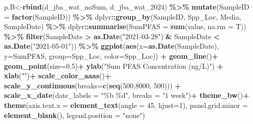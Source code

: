 \documentclass[
]{article}
\newenvironment{Shaded}{\begin{snugshade}}{\end{snugshade}}
\newcommand{\AttributeTok}[1]{\textcolor[rgb]{0.13,0.29,0.53}{#1}}
\newcommand{\DecValTok}[1]{\textcolor[rgb]{0.00,0.00,0.81}{#1}}
\newcommand{\FloatTok}[1]{\textcolor[rgb]{0.00,0.00,0.81}{#1}}
\newcommand{\FunctionTok}[1]{\textcolor[rgb]{0.13,0.29,0.53}{\textbf{#1}}}
\newcommand{\NormalTok}[1]{#1}
\newcommand{\OtherTok}[1]{\textcolor[rgb]{0.56,0.35,0.01}{#1}}
\newcommand{\SpecialCharTok}[1]{\textcolor[rgb]{0.81,0.36,0.00}{\textbf{#1}}}
\newcommand{\StringTok}[1]{\textcolor[rgb]{0.31,0.60,0.02}{#1}}
\begin{document}
\begin{Shaded}
\begin{Highlighting}[]
\NormalTok{p.B}\OtherTok{\textless{}{-}}\FunctionTok{rbind}\NormalTok{(d\_jba\_wat\_noSum, d\_jba\_wat\_2024) }\SpecialCharTok{\%\textgreater{}\%}
  \FunctionTok{mutate}\NormalTok{(}\AttributeTok{SampleID =} \FunctionTok{factor}\NormalTok{(SampleID)) }\SpecialCharTok{\%\textgreater{}\%}
\NormalTok{  dplyr}\SpecialCharTok{::}\FunctionTok{group\_by}\NormalTok{(SampleID, Spp\_Loc, Media, SampleDate) }\SpecialCharTok{\%\textgreater{}\%}
\NormalTok{  dplyr}\SpecialCharTok{::}\FunctionTok{summarise}\NormalTok{(}\AttributeTok{SumPFAS =} \FunctionTok{sum}\NormalTok{(value, }\AttributeTok{na.rm =}\NormalTok{ T)) }\SpecialCharTok{\%\textgreater{}\%}
  \FunctionTok{filter}\NormalTok{(SampleDate }\SpecialCharTok{\textgreater{}} \FunctionTok{as.Date}\NormalTok{(}\StringTok{"2021{-}03{-}28"}\NormalTok{) }\SpecialCharTok{\&}\NormalTok{ SampleDate }\SpecialCharTok{\textless{}} \FunctionTok{as.Date}\NormalTok{(}\StringTok{"2021{-}05{-}01"}\NormalTok{)) }\SpecialCharTok{\%\textgreater{}\%} 
    \FunctionTok{ggplot}\NormalTok{(}\FunctionTok{aes}\NormalTok{(}\AttributeTok{x=}\FunctionTok{as.Date}\NormalTok{(SampleDate), }\AttributeTok{y=}\NormalTok{SumPFAS, }\AttributeTok{group=}\NormalTok{Spp\_Loc, }\AttributeTok{color=}\NormalTok{Spp\_Loc)) }\SpecialCharTok{+}
    \FunctionTok{geom\_line}\NormalTok{()}\SpecialCharTok{+}
    \FunctionTok{geom\_point}\NormalTok{(}\AttributeTok{size=}\FloatTok{0.5}\NormalTok{)}\SpecialCharTok{+}
    \FunctionTok{ylab}\NormalTok{(}\StringTok{"Sum PFAS Concentration (ng/L)"}\NormalTok{) }\SpecialCharTok{+}
    \FunctionTok{xlab}\NormalTok{(}\StringTok{""}\NormalTok{)}\SpecialCharTok{+}
    \FunctionTok{scale\_color\_aaas}\NormalTok{()}\SpecialCharTok{+}
    \FunctionTok{scale\_y\_continuous}\NormalTok{(}\AttributeTok{breaks=}\FunctionTok{c}\NormalTok{(}\FunctionTok{seq}\NormalTok{(}\DecValTok{500}\NormalTok{,}\DecValTok{8000}\NormalTok{, }\DecValTok{500}\NormalTok{))) }\SpecialCharTok{+}
    \FunctionTok{scale\_x\_date}\NormalTok{(}\AttributeTok{date\_labels =} \StringTok{"\%b \%d"}\NormalTok{, }\AttributeTok{breaks =} \StringTok{"1 week"}\NormalTok{)}\SpecialCharTok{+}
    \FunctionTok{theme\_bw}\NormalTok{()}\SpecialCharTok{+}
    \FunctionTok{theme}\NormalTok{(}\AttributeTok{axis.text.x =} \FunctionTok{element\_text}\NormalTok{(}\AttributeTok{angle =} \DecValTok{45}\NormalTok{, }\AttributeTok{hjust=}\DecValTok{1}\NormalTok{),}
          \AttributeTok{panel.grid.minor =} \FunctionTok{element\_blank}\NormalTok{(),}
          \AttributeTok{legend.position =} \StringTok{"none"}\NormalTok{)}


\end{Highlighting}
\end{Shaded}
\end{document}
